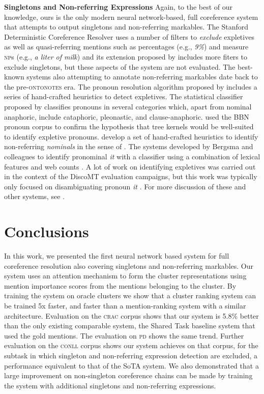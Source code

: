 \documentclass[10pt, a4paper]{article}
\newcommand{\ACRO}[1]{\textsc{#1}}
\newcommand{\CONLL}{\ACRO{conll}}
\newcommand{\CRAC}{\ACRO{crac}}
\newcommand{\PD}{\ACRO{pd}}
\newcommand{\NP}{\ACRO{np}}
\newcommand{\ONTONOTES}{\ACRO{ontonotes}}
\begin{document}
\textbf{Singletons and Non-referring Expressions} 
Again, to the best of our knowledge, ours is the only modern neural network-based, full coreference system that attempts to output singletons and non-referring markables.
The Stanford Deterministic Coreference Resolver \cite{lee-et-al:CL13} uses a number of filters to \textit{exclude} expletives as well as quasi-referring mentions such as percentages (e.g., \textit{9\%}) and measure {\NP}s (e.g., \textit{a liter of milk}) and its extension proposed by  includes more fiters to exclude singletons, but these aspects of the system are not evaluated. 
The best-known systems also attempting  to  annotate 
non-referring markables date back to the pre-{\ONTONOTES} era. 
The pronoun resolution algorithm proposed by  includes a series of hand-crafted heuristics to detect expletives.
The statistical  classifier proposed by  classifies pronouns in several categories which, apart from nominal anaphoric, include cataphoric, pleonastic, and clause-anaphoric.
 used the BBN pronoun corpus to confirm the hypothesis that tree kernels would be well-suited to identify expletive pronouns. 
 develop a set of hand-crafted heuristics to identify non-referring \textit{nominals} in the sense of . 
The systems developed by Bergsma and colleagues to identify pronominal \textit{it} with a classifier using a combination of lexical features and web counts \cite{bergsma-lin-goebel:2008:ACLMain,Bergsma:2011:nada}. 
A lot of work on identifying expletives was carried out in the context of the DiscoMT evaluation campaigns, but this work was typically only focused on disambiguating pronoun \textit{it} \cite{loaiciga-et-al:EMNLP17}.
For more discussion of these and other systems, see \cite{Uryupina-et-al:ana_book_non_referring}.

\section{Conclusions}
In this work, we presented the first neural network based  system for full coreference resolution also covering singletons and non-referring markables. 
Our system uses an attention mechanism to form the cluster representations using mention importance scores from the mentions belonging to the cluster. 
By training the system on  oracle clusters we show that a cluster ranking system can be trained 5x faster, and faster than a mention-ranking system with a similar architecture. 
Evaluation on the {\CRAC} corpus shows that our system is 5.8\% better than the only existing comparable system, the Shared Task baseline system that used the gold mentions. The evaluation on {\PD} shows the same trend. 
Further evaluation on the {\CONLL} corpus shows our system achieves on that corpus, for the subtask in which singleton and non-referring expression detection are excluded, a performance equivalent  to that of the SoTA  system.
We also demonstrated that a large improvement on non-singleton coreference chains can be made by training the system with additional singletons and non-referring expressions.
\end{document}
